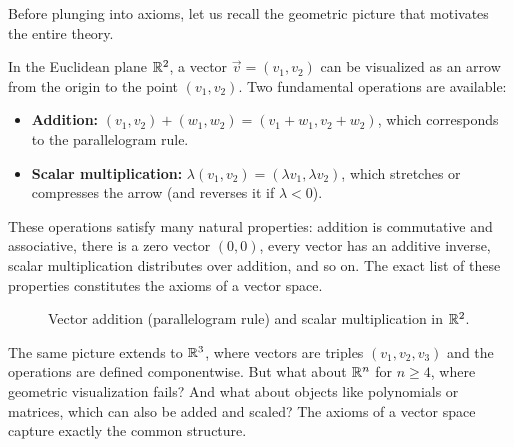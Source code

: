 Before plunging into axioms, let us recall the geometric picture that
motivates the entire theory.

In the Euclidean plane ${\mathbb{R}}^2$, a vector $\vec{v} = (v_1, v_2)$ can be
visualized as an arrow from the origin to the point $(v_1, v_2)$. Two
fundamental operations are available:
\begin{itemize}
  \item \textbf{Addition:} $(v_1,v_2)+(w_1,w_2) = (v_1+w_1, v_2+w_2)$,
    which corresponds to the parallelogram rule.
  \item \textbf{Scalar multiplication:}
    $\lambda(v_1,v_2) = (\lambda v_1, \lambda v_2)$, which stretches or
    compresses the arrow (and reverses it if $\lambda < 0$).
\end{itemize}

These operations satisfy many natural properties: addition is commutative
and associative, there is a zero vector $(0,0)$, every vector has an
additive inverse, scalar multiplication distributes over addition, and so
on. The exact list of these properties constitutes the axioms of a vector
space.

\begin{figure}[ht]
\centering
{}
\caption{Vector addition (parallelogram rule) and scalar multiplication
in ${\mathbb{R}}^2$.}
\label{fig:vector-addition-R2}
\end{figure}

The same picture extends to ${\mathbb{R}}^3$, where vectors are triples
$(v_1,v_2,v_3)$ and the operations are defined componentwise. But what
about ${\mathbb{R}}^n$ for $n\geq 4$, where geometric visualization fails? And
what about objects like polynomials or matrices, which can also be added
and scaled? The axioms of a vector space capture exactly the common
structure.


